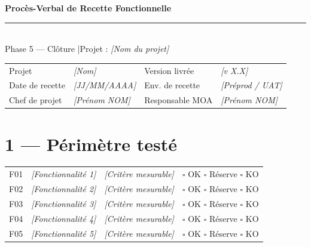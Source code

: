 \documentclass[11pt,a4paper,oneside]{report}
\begin{document}
\small

\begin{center}
{\LARGE\bfseries\color{cnNavy} Procès-Verbal de Recette Fonctionnelle}\\[4pt]
\textcolor{cnOrange}{\rule{10cm}{1pt}}\\[4pt]
{\large\color{cnSlate} Phase 5 — Clôture \quad|\quad Projet : \textit{[Nom du projet]}}
\end{center}

\vspace{4pt}
\renewcommand{\arraystretch}{1.4}
\begin{tabularx}{\textwidth}{L{3.5cm} Y L{3.5cm} Y}
\toprule
{} &  &  &  \\
\midrule
Projet          & \textit{[Nom]}           & Version livrée  & \textit{[v X.X]} \\
Date de recette & \textit{[JJ/MM/AAAA]}    & Env. de recette & \textit{[Préprod / UAT]} \\
Chef de projet  & \textit{[Prénom NOM]}    & Responsable MOA & \textit{[Prénom NOM]} \\
\bottomrule
\end{tabularx}

\section*{1 — Périmètre testé}

\renewcommand{\arraystretch}{1.3}
\begin{tabularx}{\textwidth}{C{1cm} L{5cm} Y C{3cm}}
\toprule
{}\th{\#} &  &  &  \\
\midrule
F01 & \textit{[Fonctionnalité 1]} & \textit{[Critère mesurable]} & $\square$ OK \quad $\square$ Réserve \quad $\square$ KO \\
F02 & \textit{[Fonctionnalité 2]} & \textit{[Critère mesurable]} & $\square$ OK \quad $\square$ Réserve \quad $\square$ KO \\
F03 & \textit{[Fonctionnalité 3]} & \textit{[Critère mesurable]} & $\square$ OK \quad $\square$ Réserve \quad $\square$ KO \\
F04 & \textit{[Fonctionnalité 4]} & \textit{[Critère mesurable]} & $\square$ OK \quad $\square$ Réserve \quad $\square$ KO \\
F05 & \textit{[Fonctionnalité 5]} & \textit{[Critère mesurable]} & $\square$ OK \quad $\square$ Réserve \quad $\square$ KO \\
\bottomrule
\end{tabularx}
\end{document}
